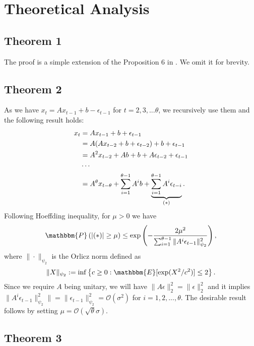 \documentclass{article}
\begin{document}
\section{Theoretical Analysis}

\subsection{Theorem 1}
The proof is a simple extension of the Proposition 6 in \cite{Hippo}. We omit it for brevity.


\subsection{Theorem 2}
As we have $x_t = Ax_{t-1} + b - \epsilon_{t-1}$ for $t=2,3,...\theta$, we recursively use them and the following result holds:
\begin{align}
    x_{t} &= Ax_{t-1} +  b + \epsilon_{t-1}\notag\\
    &= A(Ax_{t-2} +  b + \epsilon_{t-2})+  b + \epsilon_{t-1}\notag\\
    &=A^2x_{t-2} + Ab + b + A\epsilon_{t-2} + \epsilon_{t-1}\notag\\
&\cdots\notag\\
    &=A^{\theta}x_{t-\theta} + \sum_{i=1}^{\theta-1}A^ib+ \underbrace{\sum_{i=1}^{\theta-1}A^i\epsilon_{t-i}}_{(*)}\notag.
\end{align}
Following Hoeffding inequality, for $\mu>0$ we have
\begin{align}
    \mathbbm{P}\left(|(*)|\ge \mu\right)\le \exp\left(-\frac{2\mu^2}{\sum_{i=1}^{\theta -1}\|A^i\epsilon_{t-1}\|_{\psi_2}^2}\right),
\end{align}
where $\|\cdot\|_{\psi_2}$ is the Orlicz norm defined as
\begin{align}
    \|X\|_{\psi_2} :=\inf\left\{c\ge 0: \mathbbm{E}[\exp(X^2/c^2)]\le 2\right\}\notag.
\end{align}
Since we require $A$ being unitary, we will have $\|A\epsilon\|_2^2 = \|\epsilon\|_2^2$ and it implies $\|A^i\epsilon_{t-1}\|_{\psi_2}^2\| = \|\epsilon_{t-1}\|_{\psi_2}^2 =   \mathcal{O}(\sigma^2)$ for $i=1,2,...,\theta$. The desirable result follows by setting $\mu = \mathcal{O}(\sqrt{\theta}\sigma)$.

\subsection{Theorem 3}
\end{document}

